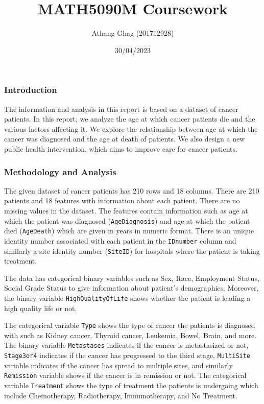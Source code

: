 \documentclass[
]{article}
\title{MATH5090M Coursework}
\author{Athang Ghag (201712928)}
\date{30/04/2023}
\begin{document}
\maketitle

\hypertarget{introduction}{%
\subsubsection{Introduction}\label{introduction}}

The information and analysis in this report is based on a dataset of
cancer patients. In this report, we analyze the age at which cancer
patients die and the various factors affecting it. We explore the
relationship between age at which the cancer was diagnosed and the age
at death of patients. We also design a new public health intervention,
which aims to improve care for cancer patients.

\hypertarget{methodology-and-analysis}{%
\subsubsection{Methodology and
Analysis}\label{methodology-and-analysis}}

The given dataset of cancer patients has 210 rows and 18 columns. There
are 210 patients and 18 features with information about each patient.
There are no missing values in the dataset. The features contain
information such as age at which the patient was diagnosed
(\texttt{AgeDiagnosis}) and age at which the patient died
(\texttt{AgeDeath}) which are given in years in numeric format. There is
an unique identity number associated with each patient in the
\texttt{IDnumber} column and similarly a site identity number
(\texttt{SiteID}) for hospitals where the patient is taking treatment.

The data has categorical binary variables such as Sex, Race, Employment
Status, Social Grade Status to give information about patient's
demographics. Moreover, the binary variable \texttt{HighQualityOfLife}
shows whether the patient is leading a high quality life or not.

The categorical variable \texttt{Type} shows the type of cancer the
patients is diagnosed with such as Kidney cancer, Thyroid cancer,
Leukemia, Bowel, Brain, and more. The binary variable
\texttt{Metastases} indicates if the cancer is metastasized or not,
\texttt{Stage3or4} indicates if the cancer has progressed to the third
stage, \texttt{MultiSite} variable indicates if the cancer has spread to
multiple sites, and similarly \texttt{Remission} variable shows if the
cancer is in remission or not. The categorical variable
\texttt{Treatment} shows the type of treatment the patients is
undergoing which include Chemotherapy, Radiotherapy, Immunotherapy, and
No Treatment.
\end{document}
